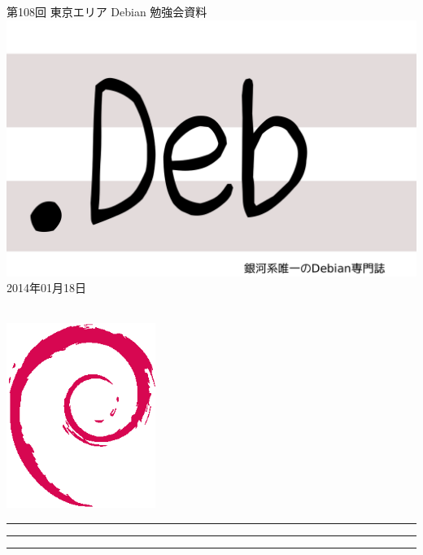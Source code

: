 \documentclass[mingoth,a4paper]{jsarticle}
\newcommand{\debmtgyear}{2014}
\newcommand{\debmtgmonth}{01}
\newcommand{\debmtgdate}{18}
\newcommand{\debmtgnumber}{108}
\begin{document}
\begin{titlepage}
\thispagestyle{empty}

\vspace*{-2cm}
第\debmtgnumber{}回 東京エリア Debian 勉強会資料\\
\hspace*{-2cm}
\includegraphics{image2012-natsu/dotdeb.pdf}\\
\hfill{}\debmtgyear{}年\debmtgmonth{}月\debmtgdate{}日

\\

\vspace*{-2cm}
\hfill{}\includegraphics[height=6cm]{image200502/openlogo-nd.eps}
\end{titlepage}

\newpage

\begin{minipage}[b]{0.2\hsize}
 \colorbox{titleback}{}
\end{minipage}
\begin{minipage}[b]{0.8\hsize}
\hrule
\vspace{2mm}
\hrule
\begin{multicols}{2}
\tableofcontents
\end{multicols}
\vspace{2mm}
\hrule
\end{minipage}
\end{document}

